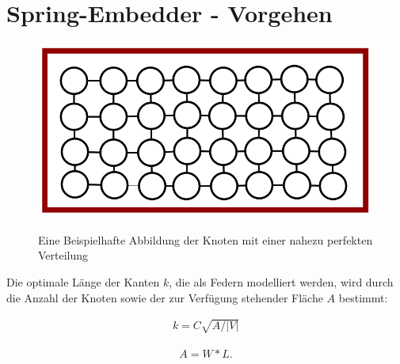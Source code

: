 \section{Spring-Embedder - Vorgehen}
\label{Kapitel_3_-_Unterkapitel_2}
%
\begin{figure}[t]
	\centering
	{\includegraphics[scale=0.5]{bilder/grenzeundperfekteverteilung}\label{fig_grenzeundperfekteverteilung}
	}\\
	\caption[Eine Beispielhafte Abbildung der Knoten mit einer nahezu perfekten Verteilung]{Eine Beispielhafte Abbildung der Knoten mit einer nahezu perfekten Verteilung}
	\label{fig_grenzeundperfekteverteilung}
\end{figure}
 Die optimale Länge der Kanten $k$, die als Federn modelliert werden, wird durch die Anzahl der Knoten sowie der zur Verfügung stehender Fläche $A$ bestimmt:

\begin{align}
	k =
	C\sqrt{A / |V|}
\end{align}

\begin{align}
	A =
	W * L.
\end{align}

